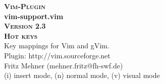 \documentclass[oneside,10pt,landscape,DIV16]{scrartcl}
\newcommand{\Pluginversion}{2.3}
\begin{document}
%

\begin{multicols}{3}
%
\begin{center}
%
\textbf{\textsc{\small{Vim-Plugin}}}\\
\textbf{\LARGE{vim-support.vim}}\\
\textbf{\textsc{\small{Version \Pluginversion}}}\\
\vspace{5mm}%
\textbf{\textsc{\Huge{Hot keys}}}\\ 
\vspace{5mm}%
Key mappings for Vim and gVim.\\
Plugin: http://vim.sourceforge.net\\
Fritz Mehner (mehner.fritz@fh-swf.de)\\
\vspace{1.0mm}
{\normalsize (i)} insert mode, {\normalsize (n)} normal mode, {\normalsize (v)} visual mode\\
\vspace{4.0mm}


\end{center}
\end{multicols}
\end{document}
